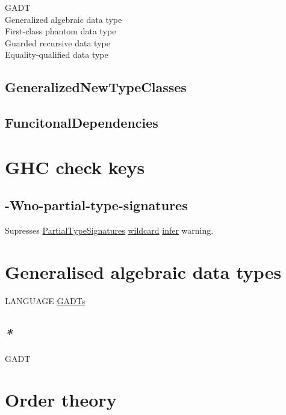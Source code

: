 \documentclass[a4paper,14pt,oneside]{book}
\begin{document}
{\label{orgd20403a}GADT\\
\label{org40af31d}Generalized algebraic data type\\
\label{org431b79c}First-class phantom data type\\
\label{orgdc9218a}Guarded recursive data type\\
\label{orge41e052}Equality-qualified data type\\

\section{\label{orgaa6ed53}GeneralizedNewTypeClasses}
\label{sec:org54009c4}

\section{\label{orgd52aa6c}FuncitonalDependencies}
\label{sec:org21d980b}

\chapter{\label{orga1e6cf5}GHC check keys}
\label{sec:orge7247e8}

\section{\label{orgc5a56e9}-Wno-partial-type-signatures}
\label{sec:org8969bbc}

Supresses \hyperref[orge79988c]{PartialTypeSignatures} \hyperref[org7d1a456]{wildcard} \hyperref[org49dbc3c]{infer} warning.\\

\chapter{\label{org4886e63}Generalised algebraic data types}
\label{sec:org9d31e1e}

LANGUAGE \hyperref[org7336225]{GADTs}\\

\section{\emph{*}}
\label{sec:org6d3fd71}

\label{orgcc0bb66}GADT\\

\chapter{\label{orge882c72}Order theory}
\label{sec:org4d4ecbd}

}
\end{document}
